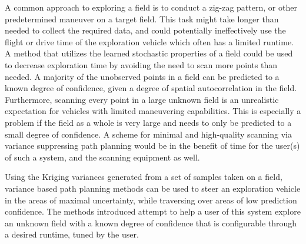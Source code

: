 A common approach to exploring a field is to conduct a zig-zag pattern, or other predetermined maneuver on a target field. This task might take longer than needed to collect the required data, and could potentially ineffectively use the flight or drive time of the exploration vehicle which often has a limited runtime. A method that utilizes the learned stochastic properties of a field could be used to decrease exploration time by avoiding the need to scan more points than needed. A majority of the unobserved points in a field can be predicted to a known degree of confidence, given a degree of spatial autocorrelation in the field. Furthermore, scanning every point in a large unknown field is an unrealistic expectation for vehicles with limited maneuvering capabilities. This is especially a problem if the field as a whole is very large and needs to only be predicted to a small degree of confidence. A scheme for minimal and high-quality scanning via variance suppressing path planning would be in the benefit of time for the user(s) of such a system, and the scanning equipment as well.

Using the Kriging variances generated from a set of samples taken on a field, variance based path planning methods can be used to steer an exploration vehicle in the areas of maximal uncertainty, while traversing over  areas of low prediction confidence. The methods introduced attempt to help a user of this system explore an unknown field with a known degree of confidence that is configurable through a desired runtime, tuned by the user.



